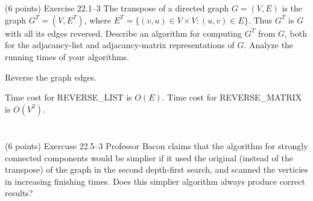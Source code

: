 \documentclass[paper=a4, fontsize=11pt]{scrartcl} %
\begin{document}
\section{}

\begin{fancyquotes}
  (6 points) Exercise 22.1--3 The transpose of a directed graph
  $G=(V,E)$ is the graph $G^T=(V,E^T)$, where $E^T=\{(v,u)\in V\times
  V : (u,v)\in E\}$. Thus $G^T$ is $G$ with all its edges
  reversed. Describe an algorithm for computing $G^T$ from $G$, both
  for the adjacancy-list and adjacancy-matrix representations of
  $G$. Analyze the running times of your algorithms.
\end{fancyquotes}

\begin{algorithm}[H]
  \caption{Reverse the graph edges.}
\end{algorithm}

Time cost for \textsc{REVERSE\_LIST} is $O(E)$.
Time cost for \textsc{REVERSE\_MATRIX} is $O(V^2)$.

\pagebreak


\section{}

\begin{fancyquotes}
  (6 points) Exercuse 22.5--3 Professor Bacon claims that the algorithm
  for strongly connected components would be simplier if it used the
  original (instead of the transpose) of the graph in the second
  depth-first search, and scanned the verticies in increasing
  finishing times. Does this simplier algorithm always produce correct
  results?
\end{fancyquotes}
\end{document}
